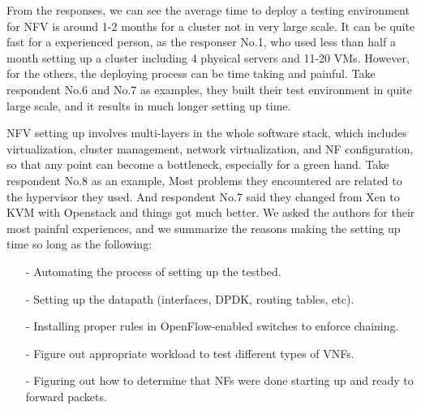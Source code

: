 From the responses, we can see the average time
to deploy a testing environment for NFV is around 1-2 months
for a cluster not in very large scale.
It can be quite fast for a experienced person,
as the responser No.1, who used less than half a month
setting up a cluster including 4 physical servers and 11-20 VMs.
However, for the others, the deploying process
can be time taking and painful.
Take respondent No.6 and No.7 as examples,
they built their test environment in quite large scale,
and it results in much longer setting up time.

NFV setting up involves multi-layers in the whole software stack,
which includes virtualization, cluster management,
network virtualization, and NF configuration,
so that any point can become a bottleneck,
especially for a green hand.
Take respondent No.8 as an example,
Most problems they encountered are related to the hypervisor they used.
And respondent No.7 said they changed from Xen
to KVM with Openstack and things got much better.
We asked the authors for their most painful experiences,
and we summarize the reasons making the setting up time so long
as the following:

\begin{itemize}
\item[-]{}
Automating the process of setting up the testbed.
\item[-]{}
Setting up the datapath (interfaces, DPDK, routing tables, etc).
\item[-]{}
Installing proper rules in OpenFlow-enabled switches to enforce chaining.
\item[-]{}
Figure out appropriate workload to test different types of VNFs.
\item[-]{}
Figuring out how to determine that NFs were done starting up and ready to forward packets.
\end{itemize}

%
%
%
%

